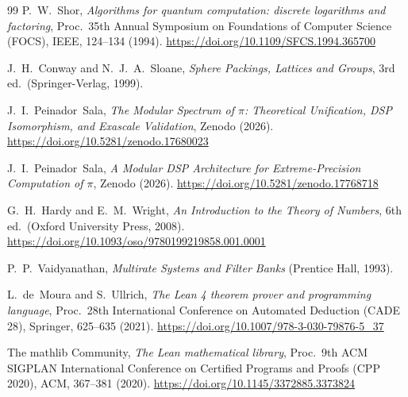 \documentclass[12pt,a4paper]{article}
\theoremstyle{plain}
\theoremstyle{definition}
\theoremstyle{remark}
\begin{document}
\begin{thebibliography}{99}
 P.~W.~Shor, \emph{Algorithms for quantum computation: discrete logarithms and factoring}, Proc.\ 35th Annual Symposium on Foundations of Computer Science (FOCS), IEEE, 124--134 (1994). \url{https://doi.org/10.1109/SFCS.1994.365700}

 J.~H.~Conway and N.~J.~A.~Sloane, \emph{Sphere Packings, Lattices and Groups}, 3rd ed.\ (Springer-Verlag, 1999).

 J.~I.~Peinador~Sala, \emph{The Modular Spectrum of \(\pi\): Theoretical Unification, DSP Isomorphism, and Exascale Validation}, Zenodo (2026). \url{https://doi.org/10.5281/zenodo.17680023}

 J.~I.~Peinador~Sala, \emph{A Modular DSP Architecture for Extreme-Precision Computation of \(\pi\)}, Zenodo (2026). \url{https://doi.org/10.5281/zenodo.17768718}

 G.~H.~Hardy and E.~M.~Wright, \emph{An Introduction to the Theory of Numbers}, 6th ed.\ (Oxford University Press, 2008). \url{https://doi.org/10.1093/oso/9780199219858.001.0001}

 P.~P.~Vaidyanathan, \emph{Multirate Systems and Filter Banks} (Prentice Hall, 1993).

 L.~de~Moura and S.~Ullrich, \emph{The Lean 4 theorem prover and programming language}, Proc.\ 28th International Conference on Automated Deduction (CADE 28), Springer, 625--635 (2021). \url{https://doi.org/10.1007/978-3-030-79876-5_37}

 The mathlib Community, \emph{The Lean mathematical library}, Proc.\ 9th ACM SIGPLAN International Conference on Certified Programs and Proofs (CPP 2020), ACM, 367--381 (2020). \url{https://doi.org/10.1145/3372885.3373824}
\end{thebibliography}
\end{document}
